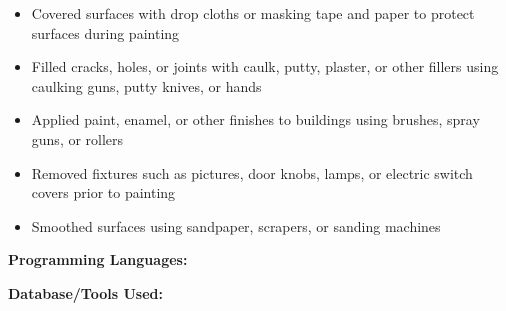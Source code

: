\documentclass[10pt,a4paper,ragged2e,withhyper]{altacv}
\begin{document}
\begin{paracol}{2}
      \begin{itemize}
        \item Covered surfaces with drop cloths or masking tape and paper to protect surfaces during painting
        \item Filled cracks, holes, or joints with caulk, putty, plaster, or other fillers using caulking guns, putty knives, or hands
        \item Applied paint, enamel, or other finishes to buildings using brushes, spray guns, or rollers
        \item Removed fixtures such as pictures, door knobs, lamps, or electric switch covers prior to painting
        \item Smoothed surfaces using sandpaper, scrapers, or sanding machines
      \end{itemize}
      
      \divider




      \divider
      
      \switchcolumn
      \divider

      \divider



      \textbf{Programming Languages: }
      \newline
      \newline
      \newline

      \textbf{Database/Tools Used:}
      \newline
      \newline
      \newline
      \newline
      \newline


\end{paracol}
\end{document}
